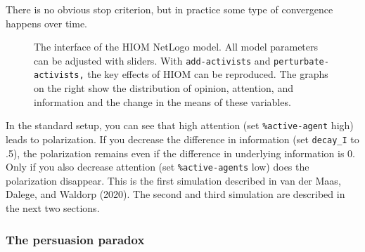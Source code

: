 \documentclass[
  a4paper,
  DIV=11,
  numbers=noendperiod,
  oneside]{scrreprt}
\begin{document}
There is no obvious stop criterion, but in practice some type of
convergence happens over time.

\begin{figure}


\caption{\label{fig-ch7-img10-old-98}The interface of the HIOM NetLogo
model. All model parameters can be adjusted with sliders. With
\texttt{add-activists} and \texttt{perturbate-activists,} the key
effects of HIOM can be reproduced. The graphs on the right show the
distribution of opinion, attention, and information and the change in
the means of these variables.}

\end{figure}%

In the standard setup, you can see that high attention (set
\texttt{\%active-agent} high) leads to polarization. If you decrease the
difference in information (set \texttt{decay\_I} to .5), the
polarization remains even if the difference in underlying information is
0. Only if you also decrease attention (set \texttt{\%active-agents}
low) does the polarization disappear. This is the first simulation
described in van der Maas, Dalege, and Waldorp (2020). The second and
third simulation are described in the next two sections.

\subsubsection{The persuasion paradox}\label{sec-The-persuasion-paradox}
\end{document}
